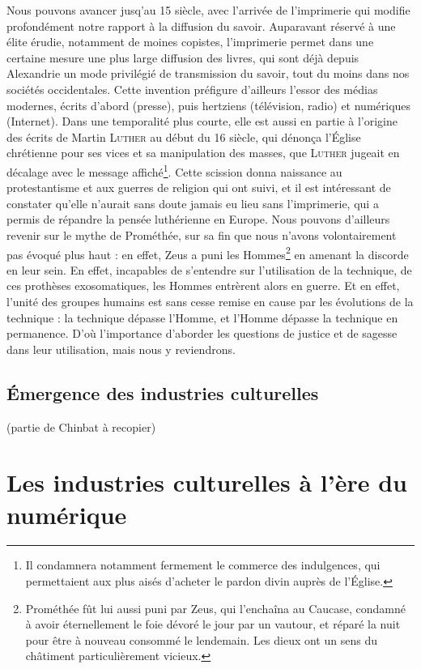 \documentclass[a4paper,12pt]{report}
\begin{document}
Nous pouvons avancer jusq'au 15 siècle, avec l'arrivée de l'imprimerie qui modifie profondément notre rapport à la diffusion du savoir. Auparavant réservé à une élite érudie, notamment de moines copistes, l'imprimerie permet dans une certaine mesure une plus large diffusion des livres, qui sont déjà depuis Alexandrie un mode privilégié de transmission du savoir, tout du moins dans nos sociétés occidentales. Cette invention préfigure d'ailleurs l'essor des médias modernes, écrits d'abord (presse), puis hertziens (télévision, radio) et numériques (Internet). Dans une temporalité plus courte, elle est aussi en partie à l'origine des écrits de Martin \textsc{Luther} au début du 16 siècle, qui dénonça l'Église chrétienne pour ses vices et sa manipulation des masses, que \textsc{Luther} jugeait en décalage avec le message affiché\footnote{Il condamnera notamment fermement le commerce des indulgences, qui permettaient aux plus aisés d'acheter le pardon divin auprès de l'Église.}. Cette scission donna naissance au protestantisme et aux guerres de religion qui ont suivi, et il est intéressant de constater qu'elle n'aurait sans doute jamais eu lieu sans l'imprimerie, qui a permis de répandre la pensée luthérienne en Europe. Nous pouvons d'ailleurs revenir sur le mythe de Prométhée, sur sa fin que nous n'avons volontairement pas évoqué plus haut : en effet, Zeus a puni les Hommes\footnote{Prométhée fût lui aussi puni par Zeus, qui l'enchaîna au Caucase, condamné à avoir éternellement le foie dévoré le jour par un vautour, et réparé la nuit pour être à nouveau consommé le lendemain. Les dieux ont un sens du châtiment particulièrement vicieux.} en amenant la discorde en leur sein. En effet, incapables de s'entendre sur l'utilisation de la technique, de ces prothèses exosomatiques, les Hommes entrèrent alors en guerre. Et en effet, l'unité des groupes humains est sans cesse remise en cause par les évolutions de la technique : la technique dépasse l'Homme, et l'Homme dépasse la technique en permanence. D'où l'importance d'aborder les questions de justice et de sagesse dans leur utilisation, mais nous y reviendrons.

\subsection{Émergence des industries culturelles}

(partie de Chinbat à recopier)

\section{Les industries culturelles à l'ère du numérique}
\end{document}
